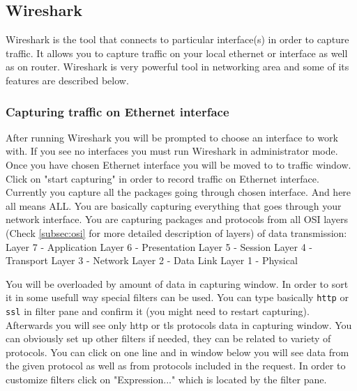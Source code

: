 \documentclass{article}[12pt]
\begin{document}
\subsection{Wireshark}
\label{subsec:wireshark}

Wireshark is the tool that connects to particular interface(s) in order to capture traffic.
It allows you to capture traffic on your local ethernet or interface as well as on router.
Wireshark is very powerful tool in networking area and some of its features are described below.

\subsubsection{Capturing traffic on Ethernet interface}

After running Wireshark you will be prompted to choose an interface to work with.
If you see no interfaces you must run Wireshark in administrator mode.
Once you have chosen Ethernet interface you will be moved to to traffic window.
Click on "start capturing" in order to record traffic on Ethernet interface.
Currently you capture all the packages going through chosen interface.
And here all means ALL.
You are basically capturing everything that goes through your network interface.
You are capturing packages and protocols from all OSI layers (Check \ref{subsec:osi} for more detailed description of layers) of data transmission: \newline \newline
Layer 7 - Application \newline
Layer 6 - Presentation \newline
Layer 5 - Session \newline
Layer 4 - Transport \newline
Layer 3 - Network \newline
Layer 2 - Data Link \newline
Layer 1 - Physical \newline


You will be overloaded by amount of data in capturing window.
In order to sort it in some usefull way special filters can be used.
You can type basically \texttt{http} or \texttt{ssl} in filter pane and confirm it (you might need to restart capturing).
Afterwards you will see only http or tls protocols data in capturing window.
You can obviously set up other filters if needed, they can be related to variety of protocols.
You can click on one line and in window below you will see data from the given protocol as well as from protocols included in the request.
In order to customize filters click on "Expression..." which is located by the filter pane.
\end{document}
